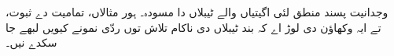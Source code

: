 \documentclass[../../../include/open-logic-chapter]{subfiles}
\begin{document}

\begin{editorial}
  وجدانیت پسند منطق لئی اگیتیاں والے ٹیبلاں دا مسودہ۔ ہور مثالاں،
  تمامیت دے ثبوت، تے ایہ وکھاؤن دی لوڑ اے کہ بند ٹیبلاں دی ناکام تلاش
  توں ردّی نمونے کیویں لبھے جا سکدے نیں۔
\end{editorial}


\OLEndChapterHook
\end{document}
